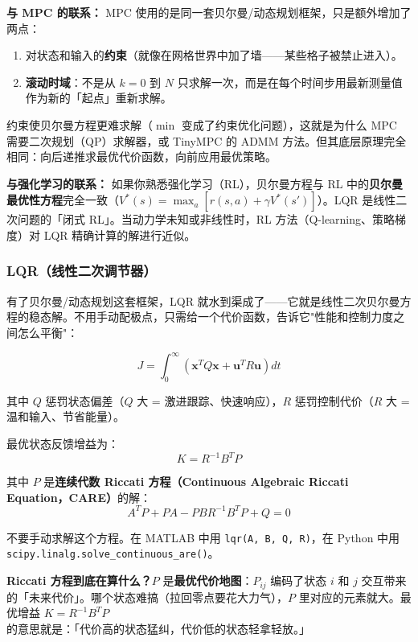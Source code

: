 \textbf{与 MPC 的联系：} MPC 使用的是同一套贝尔曼/动态规划框架，只是额外增加了两点：
\begin{enumerate}
    \item 对状态和输入的\textbf{约束}（就像在网格世界中加了墙——某些格子被禁止进入）。
    \item \textbf{滚动时域}：不是从 $k = 0$ 到 $N$ 只求解一次，而是在每个时间步用最新测量值作为新的「起点」重新求解。
\end{enumerate}

约束使贝尔曼方程更难求解（$\min$ 变成了约束优化问题），这就是为什么 MPC 需要二次规划（QP）求解器，或 TinyMPC 的 ADMM 方法。但其底层原理完全相同：向后递推求最优代价函数，向前应用最优策略。

\textbf{与强化学习的联系：} 如果你熟悉强化学习（RL），贝尔曼方程与 RL 中的\textbf{贝尔曼最优性方程}完全一致（$V^*(s) = \max_a [r(s,a) + \gamma V^*(s')]$）。LQR 是线性二次问题的「闭式 RL」。当动力学未知或非线性时，RL 方法（Q-learning、策略梯度）对 LQR 精确计算的解进行近似。

\subsubsection{LQR（线性二次调节器）}

有了贝尔曼/动态规划这套框架，LQR 就水到渠成了——它就是线性二次贝尔曼方程的稳态解。不用手动配极点，只需给一个代价函数，告诉它"性能和控制力度之间怎么平衡"：

\begin{equation}
J = \int_0^{\infty} \left( \mathbf{x}^T Q \mathbf{x} + \mathbf{u}^T R \mathbf{u} \right) dt
\end{equation}

其中 $Q$ 惩罚状态偏差（$Q$ 大 = 激进跟踪、快速响应），$R$ 惩罚控制代价（$R$ 大 = 温和输入、节省能量）。

最优状态反馈增益为：
\begin{equation}
K = R^{-1} B^T P
\end{equation}

其中 $P$ 是\textbf{连续代数 Riccati 方程（Continuous Algebraic Riccati Equation，CARE）}的解：
\begin{equation}
A^T P + PA - PBR^{-1}B^T P + Q = 0
\end{equation}

不要手动求解这个方程。在 MATLAB 中用 \texttt{lqr(A, B, Q, R)}，在 Python 中用 \texttt{scipy.linalg.solve\_continuous\_are()}。

\textbf{Riccati 方程到底在算什么？}$P$ 是\textbf{最优代价地图}：$P_{ij}$ 编码了状态 $i$ 和 $j$ 交互带来的「未来代价」。哪个状态难搞（拉回零点要花大力气），$P$ 里对应的元素就大。最优增益 $K = R^{-1}B^T P$ 的意思就是：「代价高的状态猛纠，代价低的状态轻拿轻放。」


